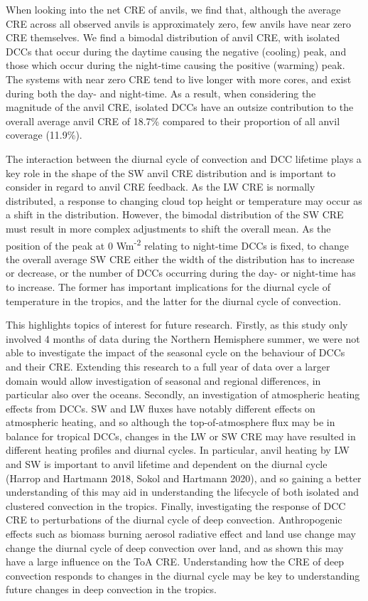 When looking into the net CRE of anvils, we find that, although the
average CRE across all observed anvils is approximately zero, few anvils
have near zero CRE themselves. We find a bimodal distribution of anvil
CRE, with isolated DCCs that occur during the daytime causing the
negative (cooling) peak, and those which occur during the night-time
causing the positive (warming) peak. The systems with near zero CRE tend
to live longer with more cores, and exist during both the day- and
night-time. As a result, when considering the magnitude of the anvil
CRE, isolated DCCs have an outsize contribution to the overall average
anvil CRE of 18.7\% compared to their proportion of all anvil coverage
(11.9\%).

The interaction between the diurnal cycle of convection and DCC lifetime
plays a key role in the shape of the SW anvil CRE distribution and is
important to consider in regard to anvil CRE feedback. As the LW CRE is
normally distributed, a response to changing cloud top height or
temperature may occur as a shift in the distribution. However, the
bimodal distribution of the SW CRE must result in more complex
adjustments to shift the overall mean. As the position of the peak at 0
Wm\textsuperscript{-2} relating to night-time DCCs is fixed, to change
the overall average SW CRE either the width of the distribution has to
increase or decrease, or the number of DCCs occurring during the day- or
night-time has to increase. The former has important implications for
the diurnal cycle of temperature in the tropics, and the latter for the
diurnal cycle of convection.

This highlights topics of interest for future research. Firstly, as this
study only involved 4 months of data during the Northern Hemisphere
summer, we were not able to investigate the impact of the seasonal cycle
on the behaviour of DCCs and their CRE. Extending this research to a
full year of data over a larger domain would allow investigation of
seasonal and regional differences, in particular also over the oceans.
Secondly, an investigation of atmospheric heating effects from DCCs. SW
and LW fluxes have notably different effects on atmospheric heating, and
so although the top-of-atmosphere flux may be in balance for tropical
DCCs, changes in the LW or SW CRE may have resulted in different heating
profiles and diurnal cycles. In particular, anvil heating by LW and SW
is important to anvil lifetime and dependent on the diurnal cycle
(Harrop and Hartmann 2018, Sokol and Hartmann 2020), and so gaining a
better understanding of this may aid in understanding the lifecycle of
both isolated and clustered convection in the tropics. Finally,
investigating the response of DCC CRE to perturbations of the diurnal
cycle of deep convection. Anthropogenic effects such as biomass burning
aerosol radiative effect and land use change may change the diurnal
cycle of deep convection over land, and as shown this may have a large
influence on the ToA CRE. Understanding how the CRE of deep convection
responds to changes in the diurnal cycle may be key to understanding
future changes in deep convection in the tropics.

